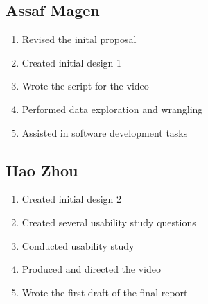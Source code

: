 \documentclass{sigchi}
\begin{document}
\subsection{Assaf Magen}

\begin{enumerate}
    \item Revised the inital proposal
    \item Created initial design 1
    \item Wrote the script for the video
    \item Performed data exploration and wrangling
    \item Assisted in software development tasks
\end{enumerate}

\subsection{Hao Zhou}

\begin{enumerate}
    \item Created initial design 2
    \item Created several usability study questions
    \item Conducted usability study
    \item Produced and directed the video
    \item Wrote the first draft of the final report
\end{enumerate}
\end{document}
